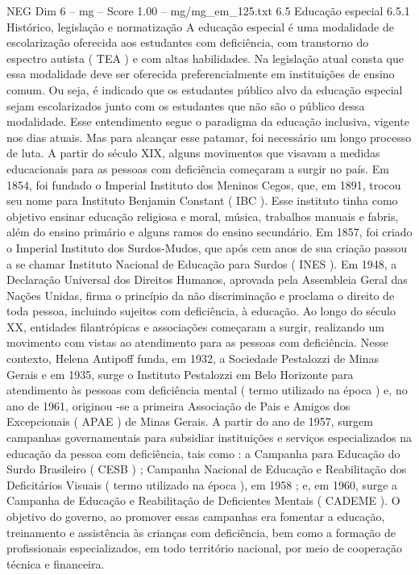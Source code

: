 \begin{textsample}{NEG Dim 6 – mg – Score 1.00 – mg/mg\_em\_125.txt}  \label{ex:f6_neg_045}
6.5 Educação especial 6.5.1 Histórico, legislação e normatização A educação especial é uma modalidade de escolarização oferecida aos estudantes com deficiência, com transtorno do espectro autista ( TEA ) e com altas habilidades.
Na legislação atual consta que essa modalidade deve ser oferecida preferencialmente em instituições de ensino comum.
Ou seja, é indicado que os estudantes público alvo da educação especial sejam escolarizados junto com os estudantes que não são o público dessa modalidade.
Esse entendimento segue o paradigma da educação inclusiva, vigente nos dias atuais.
Mas para alcançar esse patamar, foi necessário um longo processo de luta.
A partir do século XIX, alguns movimentos que visavam a medidas educacionais para as pessoas com deficiência começaram a surgir no país.
Em 1854, foi fundado o Imperial Instituto dos Meninos Cegos, que, em 1891, trocou seu nome para Instituto Benjamin Constant ( IBC ).
Esse instituto tinha como objetivo ensinar educação religiosa e moral, música, trabalhos manuais e fabris, além do ensino primário e alguns ramos do ensino secundário.
Em 1857, foi criado o Imperial Instituto dos Surdos-Mudos, que após cem anos de sua criação passou a se chamar Instituto Nacional de Educação para Surdos ( INES ).
Em 1948, a Declaração Universal dos Direitos Humanos, aprovada pela Assembleia Geral das Nações Unidas, firma o princípio da não discriminação e proclama o direito de toda pessoa, incluindo sujeitos com deficiência, à educação.
Ao longo do século XX, entidades filantrópicas e associações começaram a surgir, realizando um movimento com vistas ao atendimento para as pessoas com deficiência.
Nesse contexto, Helena Antipoff funda, em 1932, a Sociedade Pestalozzi de Minas Gerais e em 1935, surge o Instituto Pestalozzi em Belo Horizonte para atendimento às pessoas com deficiência mental ( termo utilizado na época ) e, no ano de 1961, originou -se a primeira Associação de Pais e Amigos dos Excepcionais ( APAE ) de Minas Gerais.
A partir do ano de 1957, surgem campanhas governamentais para subsidiar instituições e serviços especializados na educação da pessoa com deficiência, tais como : a Campanha para Educação do Surdo Brasileiro ( CESB ) ; Campanha Nacional de Educação e Reabilitação dos Deficitários Visuais ( termo utilizado na época ), em 1958 ; e, em 1960, surge a Campanha de Educação e Reabilitação de Deficientes Mentais ( CADEME ).
O objetivo do governo, ao promover essas campanhas era fomentar a educação, treinamento e assistência às crianças com deficiência, bem como a formação de profissionais especializados, em todo território nacional, por meio de cooperação técnica e financeira.

\end{textsample}
